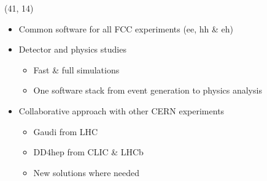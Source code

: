 \documentclass[final,xcolor={dvipsnames,svgnames,x11names,table}]{beamer}
\begin{document}
\begin{frame}
\begin{textblock}{40}
\begin{tcolorbox}[title=The Future Circular Collider Experiment (FCC)]
  \end{tcolorbox}
\end{textblock}

\begin{textblock}{40}(41, 14)
  \begin{tcolorbox}[title=FCCSW: Physics and Detector simulations with FCCSW]

  \begin{itemize}
    \item Common software for all FCC experiments (ee, hh \& eh)
    \item Detector and physics studies
      \begin{itemize}
        \item Fast \& full simulations
        \item One software stack from event generation to physics analysis
      \end{itemize}
    \item Collaborative approach with other CERN experiments
      \begin{itemize}
        \item Gaudi from LHC
        \item DD4hep from CLIC \& LHCb
        \item New solutions where needed
      \end{itemize}
  \end{itemize}

  \vspace{1cm}
  
  \centering
  \end{tcolorbox}
\end{textblock}


\end{frame}
\end{document}
